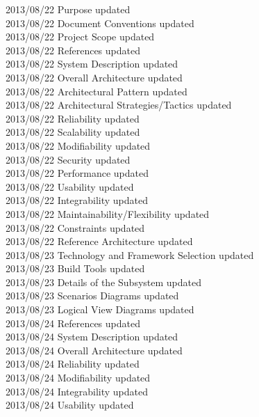 \documentclass[29pt,a4paper]{moderncv}
\begin{document}
\begin{tabbing}
2013/08/22  \> Purpose updated\\
2013/08/22  \> Document Conventions updated\\
2013/08/22  \> Project Scope updated\\
2013/08/22  \> References updated\\
2013/08/22  \> System Description updated\\
2013/08/22  \> Overall Architecture updated\\ 
2013/08/22  \> Architectural Pattern updated\\	
2013/08/22  \> Architectural Strategies/Tactics updated\\
2013/08/22  \> Reliability updated\\
2013/08/22  \> Scalability updated\\
2013/08/22  \> Modifiability updated\\
2013/08/22  \> Security updated\\
2013/08/22  \> Performance updated\\
2013/08/22  \> Usability updated\\
2013/08/22  \> Integrability updated\\
2013/08/22  \> Maintainability/Flexibility updated\\
2013/08/22  \> Constraints updated\\
2013/08/22  \> Reference Architecture updated\\
2013/08/23  \> Technology and Framework Selection updated\\
2013/08/23  \> Build Tools updated\\
2013/08/23  \> Details of the Subsystem updated\\
2013/08/23  \> Scenarios Diagrams updated\\
2013/08/23  \> Logical View Diagrams updated\\
2013/08/24  \> References updated\\
2013/08/24  \> System Description updated\\
2013/08/24  \> Overall Architecture updated\\
2013/08/24  \> Reliability updated\\
2013/08/24  \> Modifiability updated\\
2013/08/24  \> Integrability updated\\
2013/08/24  \> Usability updated\\

\end{tabbing}
\end{document}
